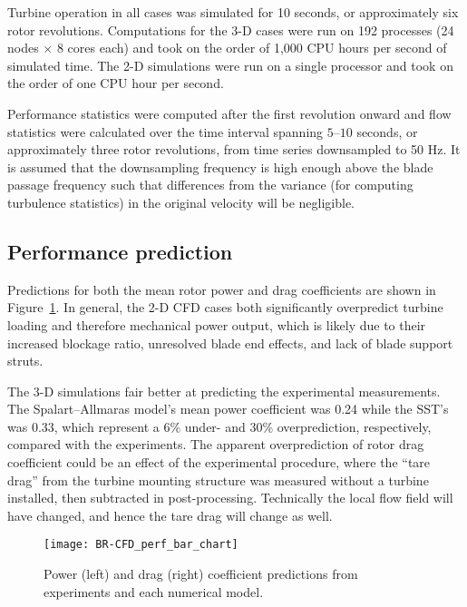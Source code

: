 Turbine operation in all cases was simulated for 10 seconds, or approximately
six rotor revolutions. Computations for the 3-D cases were run on 192 processes
(24 nodes $\times$ 8 cores each) and took on the order of 1,000 CPU hours per
second of simulated time. The 2-D simulations were run on a single processor and
took on the order of one CPU hour per second.

Performance statistics were computed after the first revolution onward and flow
statistics were calculated over the time interval spanning $5$--$10$ seconds, or
approximately three rotor revolutions, from time series downsampled to 50 Hz. It
is assumed that the downsampling frequency is high enough above the blade
passage frequency such that differences from the variance (for computing
turbulence statistics) in the original velocity will be negligible.


\subsection{Performance prediction}

Predictions for both the mean rotor power and drag coefficients are shown in
Figure~\ref{fig:br-cfd-perf-bar-chart}. In general, the 2-D CFD cases both
significantly overpredict turbine loading and therefore mechanical power output,
which is likely due to their increased blockage ratio, unresolved blade end
effects, and lack of blade support struts.

The 3-D simulations fair better at predicting the experimental measurements. The
Spalart--Allmaras model's mean power coefficient was 0.24 while the SST's was
0.33, which represent a 6\% under- and 30\% overprediction, respectively,
compared with the experiments. The apparent overprediction of rotor drag
coefficient could be an effect of the experimental procedure, where the ``tare
drag'' from the turbine mounting structure was measured without a turbine
installed, then subtracted in post-processing. Technically the local flow field
will have changed, and hence the tare drag will change as well.

\begin{figure}
    \centering

    \texttt{[image: BR-CFD\_perf\_bar\_chart]}

    \caption{Power (left) and drag (right) coefficient predictions from
        experiments and each numerical model.}

    \label{fig:br-cfd-perf-bar-chart}
\end{figure}


